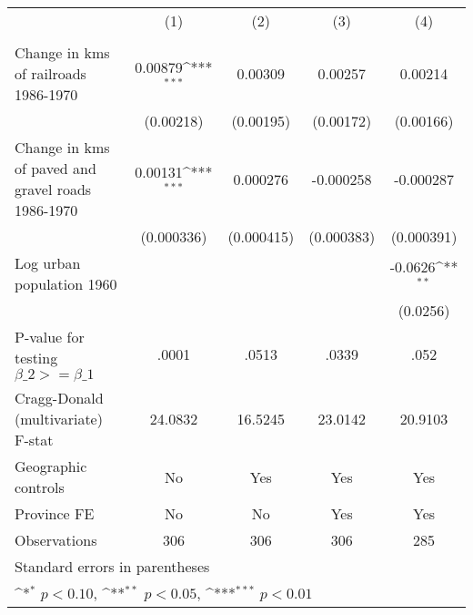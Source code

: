 {
\def\sym#1{\ifmmode^{#1}\else\(^{#1}\)\fi}
\begin{tabular}{l*{4}{c}}
\hline\hline
                &\multicolumn{1}{c}{(1)}&\multicolumn{1}{c}{(2)}&\multicolumn{1}{c}{(3)}&\multicolumn{1}{c}{(4)}\\
                &\multicolumn{1}{c}{}&\multicolumn{1}{c}{}&\multicolumn{1}{c}{}&\multicolumn{1}{c}{}\\
\hline
Change in kms of railroads 1986-1970&  0.00879\sym{***}&  0.00309         &  0.00257         &  0.00214         \\
                &(0.00218)         &(0.00195)         &(0.00172)         &(0.00166)         \\
[1em]
Change in kms of paved and gravel roads 1986-1970&  0.00131\sym{***}& 0.000276         &-0.000258         &-0.000287         \\
                &(0.000336)         &(0.000415)         &(0.000383)         &(0.000391)         \\
[1em]
Log urban population 1960&                  &                  &                  &  -0.0626\sym{**} \\
                &                  &                  &                  & (0.0256)         \\
\hline
P-value for testing $\beta\_{2} >= \beta\_{1}$&    .0001         &    .0513         &    .0339         &     .052         \\
Cragg-Donald (multivariate) F-stat&  24.0832         &  16.5245         &  23.0142         &  20.9103         \\
Geographic controls&       No         &      Yes         &      Yes         &      Yes         \\
Province FE     &       No         &       No         &      Yes         &      Yes         \\
Observations    &      306         &      306         &      306         &      285         \\
\hline\hline
\multicolumn{5}{l}{\footnotesize Standard errors in parentheses}\\
\multicolumn{5}{l}{\footnotesize \sym{*} \(p<0.10\), \sym{**} \(p<0.05\), \sym{***} \(p<0.01\)}\\
\end{tabular}
}
